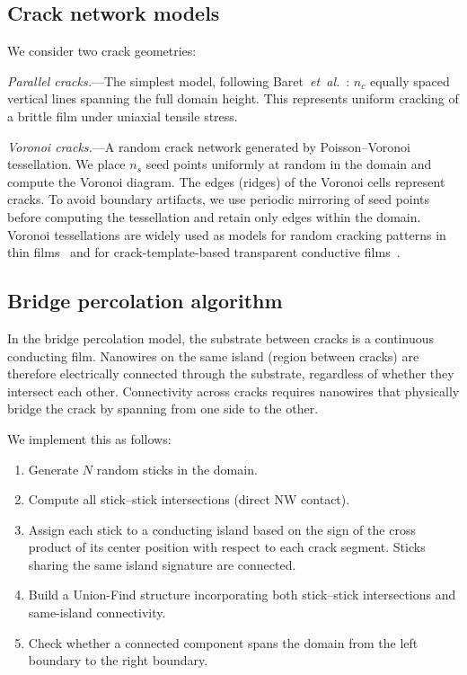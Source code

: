 \subsection{Crack network models}

We consider two crack geometries:

\textit{Parallel cracks.}---The simplest model, following
Baret~\textit{et~al.}~\cite{Baret2024}:
$n_c$ equally spaced vertical lines spanning the full domain height.
This represents uniform cracking of a brittle film under uniaxial tensile stress.

\textit{Voronoi cracks.}---A random crack network generated by
Poisson--Voronoi tessellation.
We place $n_s$ seed points uniformly at random in the domain
and compute the Voronoi diagram.
The edges (ridges) of the Voronoi cells represent cracks.
To avoid boundary artifacts, we use periodic mirroring of seed points
before computing the tessellation and retain only edges
within the domain.
Voronoi tessellations are widely used as models for random
cracking patterns in thin
films~\cite{Bohn2005,Hornig1996,Tarasevich2025}
and for crack-template-based transparent conductive
films~\cite{Tarasevich2023,Tarasevich2023b}.

\subsection{Bridge percolation algorithm}

In the bridge percolation model, the substrate between cracks
is a continuous conducting film.
Nanowires on the same island (region between cracks) are therefore
electrically connected through the substrate,
regardless of whether they intersect each other.
Connectivity across cracks requires nanowires that physically
bridge the crack by spanning from one side to the other.

We implement this as follows:
\begin{enumerate}
\item Generate $N$ random sticks in the domain.
\item Compute all stick--stick intersections (direct NW contact).
\item Assign each stick to a conducting island based on
      the sign of the cross product of its center position
      with respect to each crack segment.
      Sticks sharing the same island signature are connected.
\item Build a Union-Find structure incorporating both
      stick--stick intersections and same-island connectivity.
\item Check whether a connected component spans the domain
      from the left boundary to the right boundary.
\end{enumerate}


